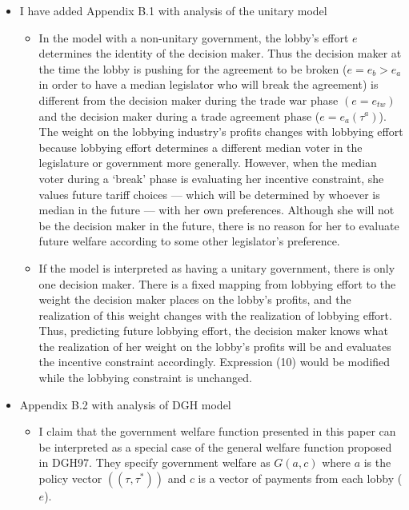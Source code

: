 \documentclass[12pt]{article}
\begin{document}
\begin{itemize}
\begin{itemize}
				\item I have added Appendix B.1 with analysis of the unitary model
					\begin{itemize}
						\item In the model with a non-unitary government, the lobby's effort $e$ determines the identity of the decision maker. Thus the decision maker at the time the lobby is pushing for the agreement to be broken ($e=e_b>e_a$ in order to have a median legislator who will break the agreement) is different from the decision maker during the trade war phase $(e = e_{tw})$ and the decision maker during a trade agreement phase ($e=e_a(\tau^a)$). The weight on the lobbying industry's profits changes with lobbying effort because lobbying effort determines a different median voter in the legislature or government more generally. However, when the median voter during a `break' phase is evaluating her incentive constraint, she values future tariff choices --- which will be determined by whoever is median in the future --- with her own preferences. Although she will not be the decision maker in the future, there is no reason for her to evaluate future welfare according to some other legislator's preference.
						\item If the model is interpreted as having a unitary government, there is only one decision maker. There is a fixed mapping from lobbying effort to the weight the decision maker places on the lobby's profits, and the realization of this weight changes with the realization of lobbying effort. Thus, predicting future lobbying effort, the decision maker knows what the realization of her weight on the lobby's profits will be and evaluates the incentive constraint accordingly. Expression (10) would be modified while the lobbying constraint is unchanged.
					\end{itemize}
				\item Appendix B.2 with analysis of DGH model
					\begin{itemize}
						\item I claim that the government welfare function presented in this paper can be interpreted as a special case of the general welfare function proposed in DGH97. They specify government welfare as $G(a,c)$ where $a$ is the policy vector $\left(\left(\tau,\tau^*\right)\right)$ and $c$ is a vector of payments from each lobby ($e$).
						

\end{itemize}
\end{itemize}
\end{itemize}
\end{document}
